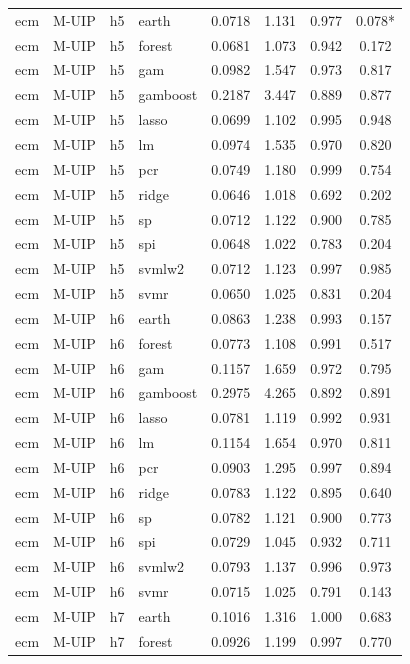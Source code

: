 \begin{ThreePartTable}
\begin{longtable}[t]{llclcccc}
\addlinespace
ecm & M-UIP & h5 & earth & 0.0718 & 1.131 & 0.977 & 0.078*\\
ecm & M-UIP & h5 & forest & 0.0681 & 1.073 & 0.942 & 0.172\\
ecm & M-UIP & h5 & gam & 0.0982 & 1.547 & 0.973 & 0.817\\
ecm & M-UIP & h5 & gamboost & 0.2187 & 3.447 & 0.889 & 0.877\\
ecm & M-UIP & h5 & lasso & 0.0699 & 1.102 & 0.995 & 0.948\\
ecm & M-UIP & h5 & lm & 0.0974 & 1.535 & 0.970 & 0.820\\
ecm & M-UIP & h5 & pcr & 0.0749 & 1.180 & 0.999 & 0.754\\
ecm & M-UIP & h5 & ridge & 0.0646 & 1.018 & 0.692 & 0.202\\
ecm & M-UIP & h5 & sp & 0.0712 & 1.122 & 0.900 & 0.785\\
ecm & M-UIP & h5 & spi & 0.0648 & 1.022 & 0.783 & 0.204\\
ecm & M-UIP & h5 & svmlw2 & 0.0712 & 1.123 & 0.997 & 0.985\\
ecm & M-UIP & h5 & svmr & 0.0650 & 1.025 & 0.831 & 0.204\\
\addlinespace
ecm & M-UIP & h6 & earth & 0.0863 & 1.238 & 0.993 & 0.157\\
ecm & M-UIP & h6 & forest & 0.0773 & 1.108 & 0.991 & 0.517\\
ecm & M-UIP & h6 & gam & 0.1157 & 1.659 & 0.972 & 0.795\\
ecm & M-UIP & h6 & gamboost & 0.2975 & 4.265 & 0.892 & 0.891\\
ecm & M-UIP & h6 & lasso & 0.0781 & 1.119 & 0.992 & 0.931\\
ecm & M-UIP & h6 & lm & 0.1154 & 1.654 & 0.970 & 0.811\\
ecm & M-UIP & h6 & pcr & 0.0903 & 1.295 & 0.997 & 0.894\\
ecm & M-UIP & h6 & ridge & 0.0783 & 1.122 & 0.895 & 0.640\\
ecm & M-UIP & h6 & sp & 0.0782 & 1.121 & 0.900 & 0.773\\
ecm & M-UIP & h6 & spi & 0.0729 & 1.045 & 0.932 & 0.711\\
ecm & M-UIP & h6 & svmlw2 & 0.0793 & 1.137 & 0.996 & 0.973\\
ecm & M-UIP & h6 & svmr & 0.0715 & 1.025 & 0.791 & 0.143\\
\addlinespace
ecm & M-UIP & h7 & earth & 0.1016 & 1.316 & 1.000 & 0.683\\
ecm & M-UIP & h7 & forest & 0.0926 & 1.199 & 0.997 & 0.770\\

\end{longtable}
\end{ThreePartTable}
